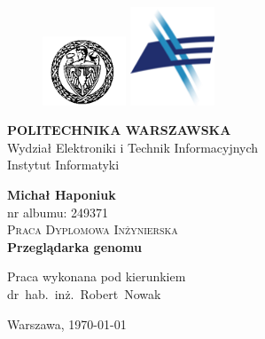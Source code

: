 \documentclass[a4paper,12pt,oneside]{mwrep}  %
\begin{document}
 

\begin{titlepage} 

\begin{figure}
        \includegraphics[width=2.5cm]{grafika/logo_pw} \hfill
        \includegraphics[width=2.5cm]{grafika/logo_weiti}
\end{figure}

\begin{center}

\LARGE{\textbf{POLITECHNIKA WARSZAWSKA}}\\
\Large{Wydział Elektroniki i Technik Informacyjnych}\\
\large{Instytut Informatyki}				%

\vfill

\vfill
\huge \textbf{Michał Haponiuk}\\  						 %
\large{nr albumu: 249371}\\[1cm] 						 %

\textsc{\Large Praca Dyplomowa Inżynierska}\\[1,5cm]     %

\huge \textbf{Przeglądarka genomu}\\[2cm] %

\vfill

\begin{flushright}
\large{Praca wykonana pod kierunkiem\\
dr~hab.~inż.~Robert~Nowak}\\[1cm] 
\end{flushright}


\large{Warszawa, \today}

\end{center}
\end{titlepage} 
\end{document}
